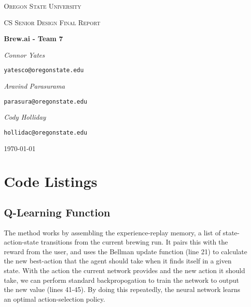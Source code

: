 \documentclass[draftclsnofoot,onecolumn,letterpaper,10pt]{IEEEtran}
\begin{document}
{\centering
	{\scshape\LARGE Oregon State University\par}
	\vspace{1cm}
	{\scshape\Large CS Senior Design Final Report\par}
	\vspace{1.5cm}
	{\huge\bfseries Brew.ai - Team 7\par}
	\vspace{2cm}
	{\Large\itshape Connor Yates\par}
	\texttt{yatesco@oregonstate.edu\\}
	{\Large\itshape Aravind Parasurama\par}
	\texttt{parasura@oregonstate.edu\\}
	{\Large\itshape Cody Holliday\par}
	\texttt{hollidac@oregonstate.edu\\}
	\vspace{2cm}
	\vfill
	{\large \today\par}
}
\newpage
\tableofcontents
\newpage












\newpage



\newpage
\appendix
\section{Code Listings}
\subsection{Q-Learning Function}
\label{lst:q-update}
The method works by assembling the experience-replay memory, a list of state-action-state transitions from the current brewing run. It pairs this with the reward from the user, and uses the Bellman update function (line 21) to calculate the new best-action that the agent should take when it finds itself in a given state. With the action the current network provides and the new action it should take, we can perform standard backpropogation to train the network to output the new value (lines 41-45). By doing this repeatedly, the neural network learns an optimal action-selection policy. 
\end{document}
